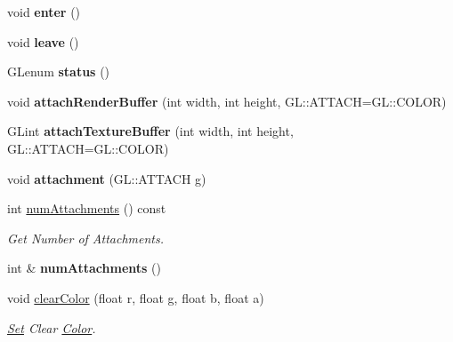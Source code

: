 \begin{DoxyCompactItemize}
\item 
\hypertarget{classvsr_1_1_f_b_o_aefe88ca6c489f0f0472f356e05e2e322}{void {\bfseries enter} ()}\label{classvsr_1_1_f_b_o_aefe88ca6c489f0f0472f356e05e2e322}

\item 
\hypertarget{classvsr_1_1_f_b_o_ae5ad2e826d6edf206f18610554731e2e}{void {\bfseries leave} ()}\label{classvsr_1_1_f_b_o_ae5ad2e826d6edf206f18610554731e2e}

\item 
\hypertarget{classvsr_1_1_f_b_o_a2861d4a27160b9d2ee9f1a170217513a}{G\-Lenum {\bfseries status} ()}\label{classvsr_1_1_f_b_o_a2861d4a27160b9d2ee9f1a170217513a}

\item 
\hypertarget{classvsr_1_1_f_b_o_a30a6cecd6c80ef8cb296a1372d4911fb}{void {\bfseries attach\-Render\-Buffer} (int width, int height, G\-L\-::\-A\-T\-T\-A\-C\-H=G\-L\-::\-C\-O\-L\-O\-R)}\label{classvsr_1_1_f_b_o_a30a6cecd6c80ef8cb296a1372d4911fb}

\item 
\hypertarget{classvsr_1_1_f_b_o_ae6c10da8c956dfef7db7e249f3d4fa9b}{G\-Lint {\bfseries attach\-Texture\-Buffer} (int width, int height, G\-L\-::\-A\-T\-T\-A\-C\-H=G\-L\-::\-C\-O\-L\-O\-R)}\label{classvsr_1_1_f_b_o_ae6c10da8c956dfef7db7e249f3d4fa9b}

\item 
\hypertarget{classvsr_1_1_f_b_o_aee7fde8b24f5ca93cef71f90335eeed3}{void {\bfseries attachment} (G\-L\-::\-A\-T\-T\-A\-C\-H g)}\label{classvsr_1_1_f_b_o_aee7fde8b24f5ca93cef71f90335eeed3}

\item 
\hypertarget{classvsr_1_1_f_b_o_a94e80cf03d5f34d918765c996b37e8ef}{int \hyperlink{classvsr_1_1_f_b_o_a94e80cf03d5f34d918765c996b37e8ef}{num\-Attachments} () const }\label{classvsr_1_1_f_b_o_a94e80cf03d5f34d918765c996b37e8ef}

\begin{DoxyCompactList}\small\item\em Get Number of Attachments. \end{DoxyCompactList}\item 
\hypertarget{classvsr_1_1_f_b_o_a3f38e8c581a849a01f9eabe68a3edf60}{int \& {\bfseries num\-Attachments} ()}\label{classvsr_1_1_f_b_o_a3f38e8c581a849a01f9eabe68a3edf60}

\item 
\hypertarget{classvsr_1_1_f_b_o_a3f2efa3da8c1d9d0e3b7cb0abff5f125}{void \hyperlink{classvsr_1_1_f_b_o_a3f2efa3da8c1d9d0e3b7cb0abff5f125}{clear\-Color} (float r, float g, float b, float a)}\label{classvsr_1_1_f_b_o_a3f2efa3da8c1d9d0e3b7cb0abff5f125}

\begin{DoxyCompactList}\small\item\em \hyperlink{classvsr_1_1_set}{Set} Clear \hyperlink{classvsr_1_1_color}{Color}. \end{DoxyCompactList}\end{DoxyCompactItemize}
